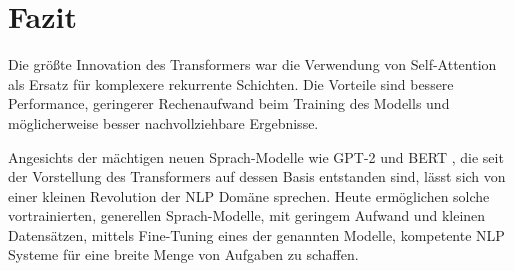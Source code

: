 \documentclass[conference]{IEEEtran}
\begin{document}
\section{Fazit}
Die größte Innovation des Transformers war die Verwendung von Self-Attention als Ersatz für komplexere rekurrente Schichten. Die Vorteile sind bessere Performance, geringerer Rechenaufwand beim Training des Modells und möglicherweise besser nachvollziehbare Ergebnisse. \cite{attention_is_all_you_need}

Angesichts der mächtigen neuen Sprach-Modelle wie GPT-2 \cite{gpt_2} und BERT \cite{bert}, die seit der Vorstellung des Transformers auf dessen Basis entstanden sind, lässt sich von einer kleinen Revolution der NLP Domäne sprechen. Heute ermöglichen solche vortrainierten, generellen Sprach-Modelle, mit geringem Aufwand und kleinen Datensätzen, mittels Fine-Tuning eines der genannten Modelle, kompetente NLP Systeme für eine breite Menge von Aufgaben zu schaffen. \cite{pretrained_models}


\printbibliography
\end{document}
